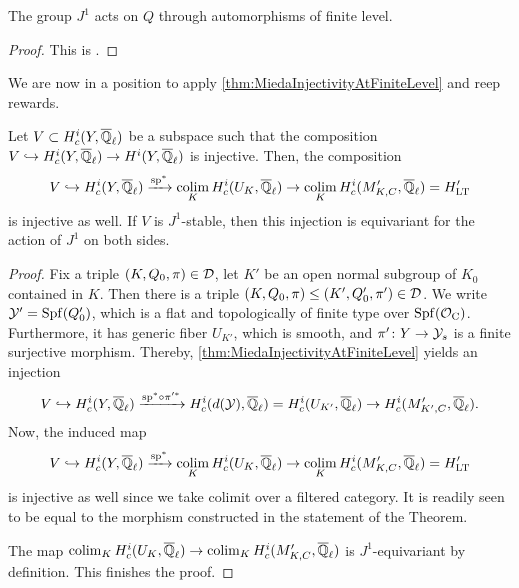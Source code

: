 \documentclass[../main.tex]{subfiles}
\begin{document}
\begin{prop}\label{prop:ActinOfJ1IsFinLevel}
  The group $J^1$ acts on $Q$ through automorphisms of finite level.
\begin{proof}
  This is \cite[Propsition 4.5]{mieda2016geometric}.
\end{proof}
\end{prop}

We are now in a position to apply \cref{thm:MiedaInjectivityAtFiniteLevel} and
reep rewards.

\begin{thm}\label{thm:MiedaAppliedToLTT}
  Let $V \subset H^i_c(Y, {\overline {\mathbb{Q}}_\ell})$ be a subspace such that the composition 
  $V \hookrightarrow H^i_c(Y, {\overline {\mathbb{Q}}_\ell}) \to H^i(Y, {\overline {\mathbb{Q}}_\ell})$ is injective. Then, the composition
  $$V \hookrightarrow H_c^i(Y, {\overline {\mathbb{Q}}_\ell}) \xrightarrow{\mathrm{sp}^*} \operatorname*{colim}_K H_c^{i}(U_K, {\overline {\mathbb{Q}}_\ell})
  \to \operatorname*{colim}_K H_c^i(M'_{K,C}, {\overline {\mathbb{Q}}_\ell}) = H_{\mathrm{LT}}'$$
  is injective as well. If $V$ is $J^1$-stable, then this injection is equivariant 
  for the action of $J^1$ on both sides.
\begin{proof}
  Fix a triple $(K, Q_0, \pi) \in \mathcal{D}$, let $K'$ be an open normal subgroup 
  of $K_0$ contained in $K$. Then there is a triple 
  $(K, Q_0, \pi) \leq (K', Q_0', \pi') \in \mathcal{D}$. We write $\mathcal{Y}' = \operatorname{Spf}(Q_0')$,
  which is a flat and topologically of finite type over $\operatorname{Spf}(\mathcal{O}_{\mathrm{C}})$. 
  Furthermore, it has generic fiber $U_{K'}$, which is smooth, 
  and $\pi'\colon Y \to \mathcal{Y}_s$ is a finite surjective morphism.
  Thereby, \cref{thm:MiedaInjectivityAtFiniteLevel} yields an injection
  \begin{equation*}
    V \hookrightarrow H^i_c(Y, {\overline {\mathbb{Q}}_\ell}) \xrightarrow{\mathrm{sp}^* \circ \pi'^*} 
    H_c^i(d(\mathcal{Y}), {\overline {\mathbb{Q}}_\ell}) = H_c^i(U_{K'}, {\overline {\mathbb{Q}}_\ell}) \to H_c^i(M'_{K', C}, {\overline {\mathbb{Q}}_\ell}).
  \end{equation*}
  Now, the induced map 
  \begin{equation*}
    V \hookrightarrow H_c^i(Y, {\overline {\mathbb{Q}}_\ell}) \xrightarrow{\mathrm{sp}^*} \operatorname*{colim}_K H_c^{i}(U_K, {\overline {\mathbb{Q}}_\ell})
    \to \operatorname*{colim}_K H_c^i(M'_{K,C}, {\overline {\mathbb{Q}}_\ell}) = H_{\mathrm{LT}}'
  \end{equation*}
  is injective as well since we take colimit over a filtered category. It is readily
  seen to be equal to the morphism constructed in the statement of the Theorem.

  The map $\operatorname*{colim}_K H_c^{i}(U_K, {\overline {\mathbb{Q}}_\ell}) \to \operatorname*{colim}_K H_c^i(M'_{K,C}, {\overline {\mathbb{Q}}_\ell})$
  is $J^1$-equivariant by definition. This finishes the proof.
\end{proof}
\end{thm}


\end{document}
